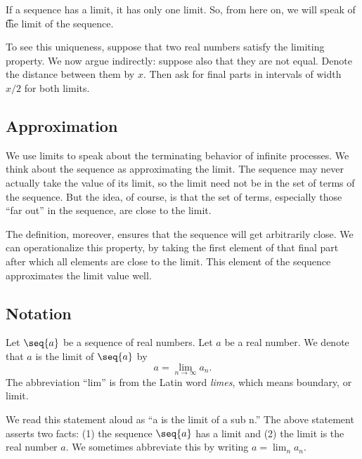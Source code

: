If a sequence has a limit, it has only one limit.
So, from here on, we will speak of \t{the limit} of the sequence.

To see this uniqueness, suppose that two real numbers satisfy the limiting property.
We now argue indirectly: suppose also that they are not equal.
Denote the distance between them by $x$.
Then ask for final parts in intervals of width $x/2$ for both limits.

\subsection*{Approximation}

We use limits to speak about the terminating behavior of infinite processes.
We think about the sequence as approximating the limit.
The sequence may never actually take the value of its limit, so the limit need not be in the set of terms of the sequence.
But the idea, of course, is that the set of terms, especially those ``far out'' in the sequence, are close to the limit.

The definition, moreover, ensures that the sequence will get arbitrarily close.
We can operationalize this property, by taking the first element of that final part after which all elements are close to the limit.
This element of the sequence approximates the limit value well.

\subsection*{Notation}

Let $\seq{a}$ be a sequence of real numbers.
Let $a$ be a real number.
We denote that $a$ is the limit of $\seq{a}$ by
\[
a = \lim_{n \to \infty} a_n.
\]
The abbreviation ``lim'' is from the Latin word \textit{limes}, which means boundary, or limit.

We read this statement aloud as ``a is the limit of a sub n.''
The above statement asserts two facts: (1) the sequence $\seq{a}$ has a limit and (2) the limit is the real number $a$.
We sometimes abbreviate this by writing
$a = \lim_{n} a_n$.

